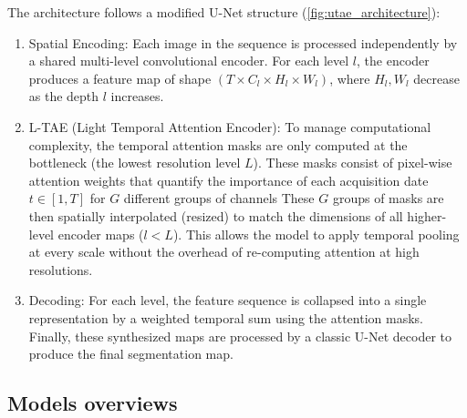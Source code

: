\documentclass[11pt]{article}
\begin{document}
The architecture follows a modified U-Net structure
(\autoref{fig:utae_architecture}):
\begin{enumerate}
  \item Spatial Encoding: Each image in the sequence is
    processed independently by a shared multi-level convolutional
    encoder. For each level $l$, the encoder produces a feature map
    of shape $(T \times C_l \times H_l \times W_l)$, where $H_l, W_l$
    decrease as the depth $l$ increases.
  \item L-TAE (Light Temporal Attention Encoder): To manage
    computational complexity, the temporal attention masks are only
    computed at the bottleneck (the lowest resolution level $L$).
    These masks consist of pixel-wise attention weights that quantify
    the importance of each acquisition date $t \in [1, T]$ for $G$
    different groups of channels These $G$ groups of masks are then
    spatially interpolated (resized) to match the dimensions of all
    higher-level encoder maps ($l < L$). This allows the model to
    apply temporal pooling at every scale without the overhead of
    re-computing attention at high resolutions.
  \item Decoding: For each level, the feature sequence is
    collapsed into a single representation by a weighted temporal sum
    using the attention masks.  Finally, these synthesized maps are
    processed by a classic U-Net decoder to produce the final
    segmentation map.
\end{enumerate}

\subsection{Models overviews}
\end{document}

